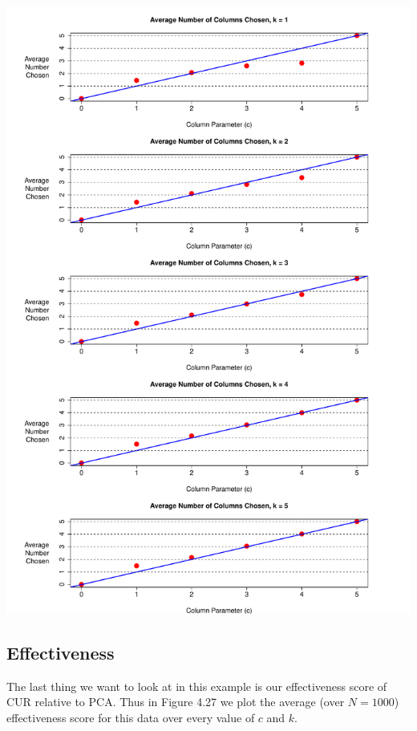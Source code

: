 \documentclass{book}
\begin{document}
\newpage
\begin{center}
\includegraphics[scale=.63]{./Figures/crabs/chosen.pdf}
\end{center}


\newpage
\subsection{Effectiveness}

The last thing we want to look at in this example is our effectiveness score of CUR relative to PCA. Thus in Figure 4.27 we plot the average (over $N=1000$) effectiveness score for this data over every value of $c$ and $k$. 
\end{document}
